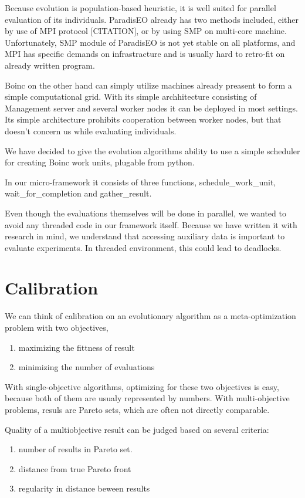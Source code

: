 \documentclass[12pt,oneside,draft]{fithesis2}
\begin{document}
Because evolution is population-based heuristic, it is well suited for parallel evaluation of its individuals. ParadisEO already has two methods included, either by use of MPI protocol [CITATION], or by using SMP on multi-core machine. Unfortunately, SMP module of ParadisEO is not yet stable on all platforms, and MPI has specific demands on infrastracture and is usually hard to retro-fit on already written program. 

Boinc on the other hand  can simply utilize machines already preasent to form a simple computational grid. With its simple archhitecture consisting of Management server and several worker nodes it can be deployed in most settings. Its simple architecture prohibits cooperation between worker nodes, but that doesn't concern us while evaluating individuals.

We have decided to give the evolution algorithms ability to use a simple scheduler for creating Boinc work units, plugable from python.

In our micro-framework it consists of three functions, schedule\_work\_unit, wait\_for\_completion and gather\_result.

Even though the evaluations themselves will be done in parallel, we wanted to avoid any threaded code in our framework itself. Because we have written it with research in mind, we understand that accessing auxiliary data is important to evaluate experiments. In threaded environment, this could lead to deadlocks.

\section{Calibration}

We can think of calibration on an evolutionary algorithm as a meta-optimization problem with two objectives,

\begin{enumerate}
\item maximizing the fittness of result
\item minimizing the number of evaluations
\end{enumerate}
With single-objective algorithms, optimizing for these two objectives is easy, because both of them are usualy represented by numbers.
With multi-objective problems, resuls are Pareto sets, which are often not directly comparable.

Quality of a multiobjective result can be judged based on several criteria:
\begin{enumerate}
\item number of results in Pareto set.
\item distance from true Pareto front
\item regularity in distance beween results
\end{enumerate}
\end{document}
